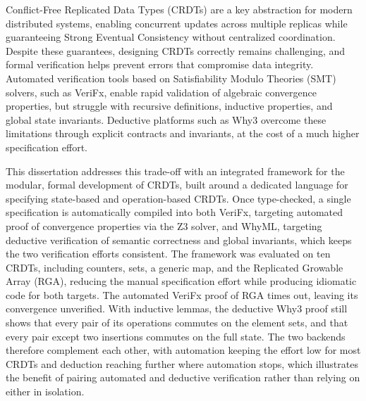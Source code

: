 
%

Conflict-Free Replicated Data Types (CRDTs) are a key abstraction for modern distributed systems, enabling concurrent
updates across multiple replicas while guaranteeing Strong Eventual Consistency without centralized coordination. Despite
these guarantees, designing CRDTs correctly remains challenging, and formal verification helps prevent errors that
compromise data integrity. Automated verification tools based on Satisfiability Modulo Theories (SMT) solvers, such as
VeriFx, enable rapid validation of algebraic convergence properties, but struggle with recursive definitions, inductive
properties, and global state invariants. Deductive platforms such as Why3 overcome these limitations through explicit
contracts and invariants, at the cost of a much higher specification effort.

This dissertation addresses this trade-off with an integrated framework for the modular, formal development of CRDTs,
built around a dedicated language for specifying state-based and operation-based CRDTs. Once type-checked, a single
specification is automatically compiled into both VeriFx, targeting automated proof of convergence properties via the Z3
solver, and WhyML, targeting deductive verification of semantic correctness and global invariants, which keeps the two
verification efforts consistent. The framework was evaluated on ten CRDTs, including counters, sets, a generic map, and
the Replicated Growable Array (RGA), reducing the manual specification effort while producing idiomatic code for both
targets. The automated VeriFx proof of RGA times out, leaving its convergence unverified. With inductive lemmas, the
deductive Why3 proof still shows that every pair of its operations commutes on the element sets, and that every pair
except two insertions commutes on the full state. The two backends therefore complement each other, with automation
keeping the effort low for most CRDTs and deduction reaching further where automation stops, which illustrates the benefit
of pairing automated and deductive verification rather than relying on either in isolation.

